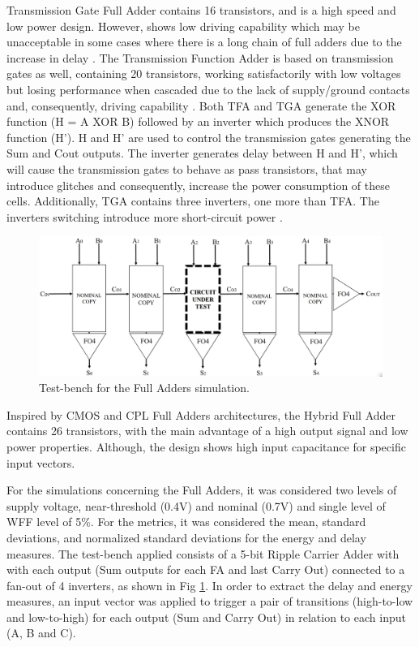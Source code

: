 \documentclass[pgmicro,diss,english]{iiufrgs}
\begin{document}
Transmission Gate Full Adder \cite{weste1985principles} contains 16 transistors, and is a high speed and low power design. However, shows low driving capability which may be unacceptable in some cases where there is a long chain of full adders due to the increase in delay \cite{islam2011design}. The Transmission Function Adder is based on transmission gates as well, containing 20 transistors, working satisfactorily with low voltages but losing performance when cascaded due to the lack of supply/ground contacts and, consequently, driving capability \cite{navi2009novel}. Both TFA and TGA generate the XOR function (H = A XOR B) followed by an inverter which produces the XNOR function (H’). H and H’ are used to control the transmission gates generating the Sum and Cout outputs. The inverter generates delay between H and H’, which will cause the transmission gates to behave as pass transistors, that may introduce glitches and consequently, increase the power consumption of these cells. Additionally, TGA contains three inverters, one more than TFA. The inverters switching introduce more short-circuit power \cite{shams2000novel}.

\begin{figure}[b]
\centering
\includegraphics[width=\textwidth, trim={0cm 0cm 0cm 0cm},clip]{testbenchFA.png}
\caption{Test-bench for the Full Adders simulation.}
\label{fig:tbFA}
\end{figure}

Inspired by CMOS and CPL Full Adders architectures, the Hybrid Full Adder \cite{navi2009novel} contains 26 transistors, with the main advantage of a high output signal and low power properties. Although, the design shows high input capacitance for specific input vectors.

For the simulations concerning the Full Adders, it was considered two levels of supply voltage, near-threshold (0.4V) and nominal (0.7V) and single level of WFF level of 5\%. For the metrics, it was considered the mean, standard deviations, and normalized standard deviations for the energy and delay measures. The test-bench applied consists of a 5-bit Ripple Carrier Adder with with each output (Sum outputs for each FA and last Carry Out) connected to a fan-out of 4 inverters, as shown in Fig \ref{fig:tbFA}. In order to extract the delay and energy measures, an input vector was applied to trigger a pair of transitions (high-to-low and low-to-high) for each output (Sum and Carry Out) in relation to each input (A, B and C).
\end{document}

